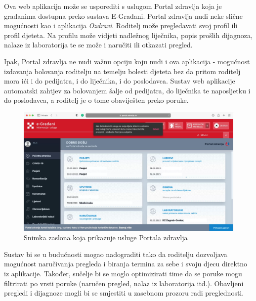 		
		Ova web aplikacija može se usporediti s uslugom Portal zdravlja koja je građanima dostupna preko sustava E-Građani. Portal zdravlja nudi neke slične mogućnosti kao i aplikacija \textit{Ozdravi}. Roditelj može pregledavati svoj profil ili profil djeteta. Na profilu može vidjeti nadležnog liječnika, popis prošlih dijagnoza, nalaze iz laboratorija te se može i naručiti ili otkazati pregled.
		 
		Ipak, Portal zdravlja ne nudi važnu opciju koju nudi i ova aplikacija - mogućnost izdavanja bolovanja roditelju na temelju bolesti djeteta bez da pritom roditelj mora ići i do pedijatra, i do liječnika, i do poslodavca. Sustav web aplikacije automatski zahtjev za bolovanjem šalje od pedijatra, do liječnika te naposljetku i do poslodavca, a roditelj je o tome obaviješten preko poruke.\\
		
		\begin{figure}[H]
			\includegraphics[width=\textwidth]{slike/portalZdravlja.PNG} %
			\caption{Snimka zaslona koja prikazuje usluge Portala zdravlja}
		\end{figure}
		
		Sustav bi se u budućnosti mogao nadograditi tako da roditelju dozvoljava mogućnost naručivanja pregleda i biranja termina za sebe i svoju djecu direktno iz aplikacije. Također, sučelje bi se moglo optimizirati time da se poruke mogu filtrirati po vrsti poruke (naručen pregled, nalaz iz laboratorija itd.). Obavljeni pregledi i dijagnoze mogli bi se smjestiti u zasebnom prozoru radi preglednosti. 
		
	